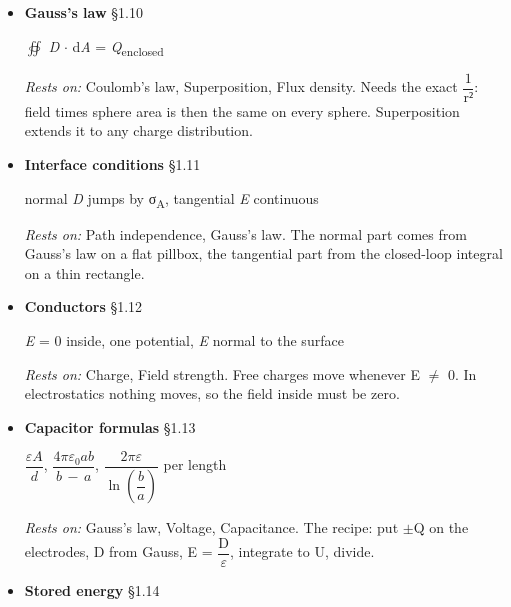 \documentclass[11pt]{article}
\begin{document}
\begin{keepsection}
\begin{itemize}
$\oint $ \textit{E} \ensuremath{\cdot} d\textit{s} = 0

\emph{Rests on:} Coulomb’s law, Superposition, Field strength. A central force that depends only on r does no net work around a closed loop. Superposition extends this to any arrangement of charges.
\item {}
\textbf{Gauss’s law} \hfill{\small\color{FAUblue}§1.10}

$\oiint $ \textit{D} \ensuremath{\cdot} d\textit{A} = \textit{Q}\textsubscript{enclosed}

\emph{Rests on:} Coulomb’s law, Superposition, Flux density. Needs the exact {\small\ensuremath{\dfrac{1}{\mathrm{r}²}}}: field times sphere area is then the same on every sphere. Superposition extends it to any charge distribution.
\item {}
\textbf{Interface conditions} \hfill{\small\color{FAUblue}§1.11}

normal \textit{D} jumps by σ\textsubscript{A}, tangential \textit{E} continuous

\emph{Rests on:} Path independence, Gauss’s law. The normal part comes from Gauss’s law on a flat pillbox, the tangential part from the closed-loop integral on a thin rectangle.
\item {}
\textbf{Conductors} \hfill{\small\color{FAUblue}§1.12}

\textit{E} = 0 inside, one potential, \textit{E} normal to the surface

\emph{Rests on:} Charge, Field strength. Free charges move whenever E \ensuremath{\neq} 0. In electrostatics nothing moves, so the field inside must be zero.
\item {}
\textbf{Capacitor formulas} \hfill{\small\color{FAUblue}§1.13}

{\small\ensuremath{\dfrac{ε{A}}{{d}}}}, {\small\ensuremath{\dfrac{4πε_{0}{ab}}{{b}\, -\, {a}}}}, {\small\ensuremath{\dfrac{2πε}{\ln (\dfrac{{b}}{{a}})}}} per length

\emph{Rests on:} Gauss’s law, Voltage, Capacitance. The recipe: put \ensuremath{\pm}Q on the electrodes, D from Gauss, E = {\small\ensuremath{\dfrac{\mathrm{D}}{ε}}}, integrate to U, divide.
\item {}
\textbf{Stored energy} \hfill{\small\color{FAUblue}§1.14}


\end{itemize}
\end{keepsection}
\end{document}
